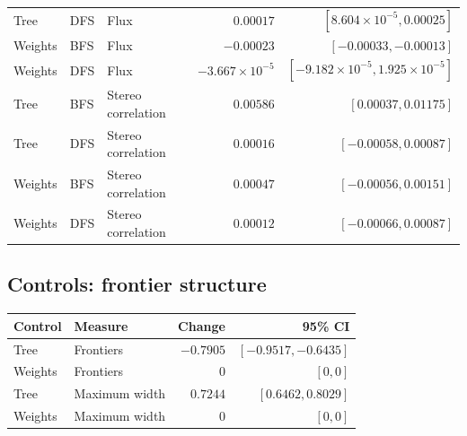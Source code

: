 \documentclass[11pt,a4paper]{article}
\begin{document}
{\begin{longtable}{lllrr}
Tree & DFS & Flux & $0.00017$ & $[8.604\times10^{-5}, 0.00025]$ \\
Weights & BFS & Flux & $-0.00023$ & $[-0.00033, -0.00013]$ \\
Weights & DFS & Flux & $-3.667\times10^{-5}$ & $[-9.182\times10^{-5}, 1.925\times10^{-5}]$ \\
Tree & BFS & Stereo correlation & $0.00586$ & $[0.00037, 0.01175]$ \\
Tree & DFS & Stereo correlation & $0.00016$ & $[-0.00058, 0.00087]$ \\
Weights & BFS & Stereo correlation & $0.00047$ & $[-0.00056, 0.00151]$ \\
Weights & DFS & Stereo correlation & $0.00012$ & $[-0.00066, 0.00087]$ \\
\bottomrule
\end{longtable}}

\subsection{Controls: frontier structure}
{\small\setlength{\tabcolsep}{5pt}
\begin{longtable}{llrr}
\toprule
Control & Measure & Change & 95\% CI \\
\midrule\endhead
Tree & Frontiers & $-0.7905$ & $[-0.9517, -0.6435]$ \\
Weights & Frontiers & $0$ & $[0, 0]$ \\
Tree & Maximum width & $0.7244$ & $[0.6462, 0.8029]$ \\
Weights & Maximum width & $0$ & $[0, 0]$ \\
\bottomrule
\end{longtable}}
\end{document}
